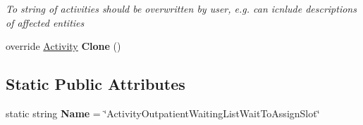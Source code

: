 \begin{DoxyCompactItemize}
\begin{DoxyCompactList}\small\item\em To string of activities should be overwritten by user, e.\+g. can icnlude descriptions of affected entities \end{DoxyCompactList}\item 
override \hyperlink{class_simulation_core_1_1_h_c_c_m_elements_1_1_activity}{Activity} {\bfseries Clone} ()\hypertarget{class_general_health_care_elements_1_1_department_models_1_1_outpatient_1_1_waiting_list_1_1_act8586a0b22c75d36396c6c75291998c21_ac73c7ae0b069bfc5c7d5fe7ad26bc08b}{}\label{class_general_health_care_elements_1_1_department_models_1_1_outpatient_1_1_waiting_list_1_1_act8586a0b22c75d36396c6c75291998c21_ac73c7ae0b069bfc5c7d5fe7ad26bc08b}

\end{DoxyCompactItemize}
\subsection*{Static Public Attributes}
\begin{DoxyCompactItemize}
\item 
static string {\bfseries Name} = \char`\"{}Activity\+Outpatient\+Waiting\+List\+Wait\+To\+Assign\+Slot\char`\"{}\hypertarget{class_general_health_care_elements_1_1_department_models_1_1_outpatient_1_1_waiting_list_1_1_act8586a0b22c75d36396c6c75291998c21_a9fab8114b382bddce599fbd19e588e4c}{}\label{class_general_health_care_elements_1_1_department_models_1_1_outpatient_1_1_waiting_list_1_1_act8586a0b22c75d36396c6c75291998c21_a9fab8114b382bddce599fbd19e588e4c}

\end{DoxyCompactItemize}
